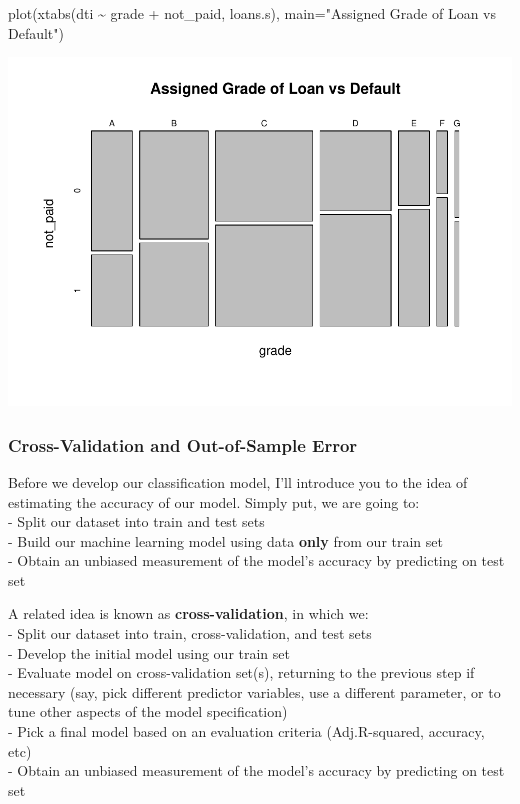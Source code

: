 \documentclass[
]{article}
\newenvironment{Shaded}{\begin{snugshade}}{\end{snugshade}}
\newcommand{\AttributeTok}[1]{\textcolor[rgb]{0.77,0.63,0.00}{#1}}
\newcommand{\FunctionTok}[1]{\textcolor[rgb]{0.00,0.00,0.00}{#1}}
\newcommand{\NormalTok}[1]{#1}
\newcommand{\SpecialCharTok}[1]{\textcolor[rgb]{0.00,0.00,0.00}{#1}}
\newcommand{\StringTok}[1]{\textcolor[rgb]{0.31,0.60,0.02}{#1}}
\begin{document}
\begin{Shaded}
\begin{Highlighting}[]
\FunctionTok{plot}\NormalTok{(}\FunctionTok{xtabs}\NormalTok{(dti }\SpecialCharTok{\textasciitilde{}}\NormalTok{ grade }\SpecialCharTok{+}\NormalTok{ not\_paid, loans.s), }
     \AttributeTok{main=}\StringTok{"Assigned Grade of Loan vs Default"}\NormalTok{)}
\end{Highlighting}
\end{Shaded}

\includegraphics{classification1_files/figure-latex/unnamed-chunk-38-1.pdf}

\hypertarget{cross-validation-and-out-of-sample-error}{%
\subsubsection{Cross-Validation and Out-of-Sample
Error}\label{cross-validation-and-out-of-sample-error}}

Before we develop our classification model, I'll introduce you to the
idea of estimating the accuracy of our model. Simply put, we are going
to:\\
- Split our dataset into train and test sets\\
- Build our machine learning model using data \textbf{only} from our
train set\\
- Obtain an unbiased measurement of the model's accuracy by predicting
on test set

A related idea is known as \textbf{cross-validation}, in which we:\\
- Split our dataset into train, cross-validation, and test sets\\
- Develop the initial model using our train set\\
- Evaluate model on cross-validation set(s), returning to the previous
step if necessary (say, pick different predictor variables, use a
different parameter, or to tune other aspects of the model
specification)\\
- Pick a final model based on an evaluation criteria (Adj.R-squared,
accuracy, etc)\\
- Obtain an unbiased measurement of the model's accuracy by predicting
on test set
\end{document}
